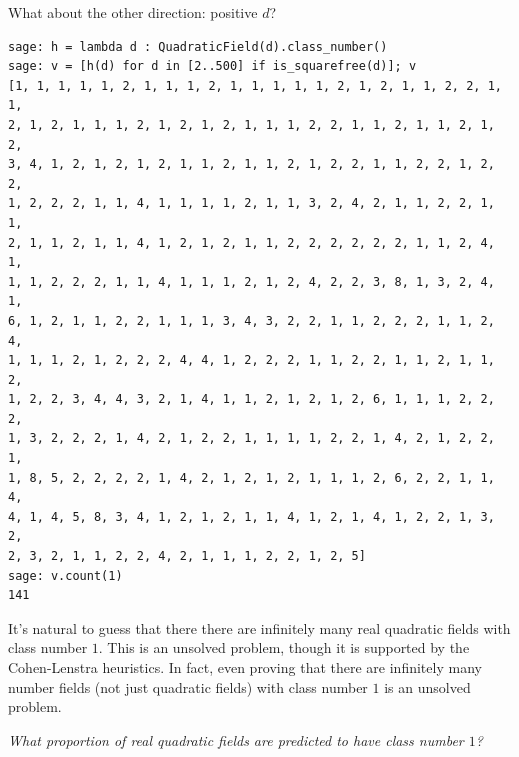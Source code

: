 \documentclass{book}
\newcommand{\hw}[2]{\par\vspace{1em}{\bf HW (#1):} {\em #2}\par\vspace{1em}}
\begin{document}
What about the other direction: positive $d$?
\begin{lstlisting}
sage: h = lambda d : QuadraticField(d).class_number()
sage: v = [h(d) for d in [2..500] if is_squarefree(d)]; v
[1, 1, 1, 1, 1, 2, 1, 1, 1, 2, 1, 1, 1, 1, 1, 2, 1, 2, 1, 1, 2, 2, 1, 1,
2, 1, 2, 1, 1, 1, 2, 1, 2, 1, 2, 1, 1, 1, 2, 2, 1, 1, 2, 1, 1, 2, 1, 2,
3, 4, 1, 2, 1, 2, 1, 2, 1, 1, 2, 1, 1, 2, 1, 2, 2, 1, 1, 2, 2, 1, 2, 2,
1, 2, 2, 2, 1, 1, 4, 1, 1, 1, 1, 2, 1, 1, 3, 2, 4, 2, 1, 1, 2, 2, 1, 1,
2, 1, 1, 2, 1, 1, 4, 1, 2, 1, 2, 1, 1, 2, 2, 2, 2, 2, 2, 1, 1, 2, 4, 1,
1, 1, 2, 2, 2, 1, 1, 4, 1, 1, 1, 2, 1, 2, 4, 2, 2, 3, 8, 1, 3, 2, 4, 1,
6, 1, 2, 1, 1, 2, 2, 1, 1, 1, 3, 4, 3, 2, 2, 1, 1, 2, 2, 2, 1, 1, 2, 4,
1, 1, 1, 2, 1, 2, 2, 2, 4, 4, 1, 2, 2, 2, 1, 1, 2, 2, 1, 1, 2, 1, 1, 2,
1, 2, 2, 3, 4, 4, 3, 2, 1, 4, 1, 1, 2, 1, 2, 1, 2, 6, 1, 1, 1, 2, 2, 2,
1, 3, 2, 2, 2, 1, 4, 2, 1, 2, 2, 1, 1, 1, 1, 2, 2, 1, 4, 2, 1, 2, 2, 1,
1, 8, 5, 2, 2, 2, 2, 1, 4, 2, 1, 2, 1, 2, 1, 1, 1, 2, 6, 2, 2, 1, 1, 4,
4, 1, 4, 5, 8, 3, 4, 1, 2, 1, 2, 1, 1, 4, 1, 2, 1, 4, 1, 2, 2, 1, 3, 2,
2, 3, 2, 1, 1, 2, 2, 4, 2, 1, 1, 1, 2, 2, 1, 2, 5]
sage: v.count(1)
141
\end{lstlisting}
It's natural to guess that there there are infinitely many
real quadratic fields with class number $1$.
This is an unsolved problem, though it is supported
by the Cohen-Lenstra heuristics.   In fact, even proving
that there are infinitely many number fields (not just quadratic
fields) with class number $1$ is an unsolved problem.

\hw{Volunteer}{What proportion of real quadratic fields are
predicted to have class number $1$?}
\end{document}
